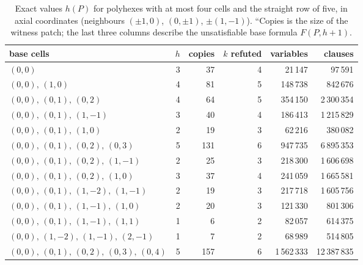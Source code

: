 \begin{table}[ht]
\centering\small
\caption{Exact values $h(P)$ for polyhexes with at most four cells and the straight row of five, in axial coordinates (neighbours $(\pm1,0)$, $(0,\pm1)$, $\pm(1,-1)$). ``Copies is the size of the witness patch; the last three columns describe the unsatisfiable base formula $F(P,h+1)$.}\label{tab:hex}
\begin{tabular}{lrrrrr}\toprule
base cells & $h$ & copies & $k$ refuted & variables & clauses\\\midrule
$(0,0)$ & 3 & 37 & 4 & 21\,147 & 97\,591 \\
$(0,0),\,(1,0)$ & 4 & 81 & 5 & 148\,738 & 842\,676 \\
$(0,0),\,(0,1),\,(0,2)$ & 4 & 64 & 5 & 354\,150 & 2\,300\,354 \\
$(0,0),\,(0,1),\,(1,-1)$ & 3 & 40 & 4 & 186\,413 & 1\,215\,829 \\
$(0,0),\,(0,1),\,(1,0)$ & 2 & 19 & 3 & 62\,216 & 380\,082 \\
$(0,0),\,(0,1),\,(0,2),\,(0,3)$ & 5 & 131 & 6 & 947\,735 & 6\,895\,353 \\
$(0,0),\,(0,1),\,(0,2),\,(1,-1)$ & 2 & 25 & 3 & 218\,300 & 1\,606\,698 \\
$(0,0),\,(0,1),\,(0,2),\,(1,0)$ & 3 & 37 & 4 & 241\,059 & 1\,665\,581 \\
$(0,0),\,(0,1),\,(1,-2),\,(1,-1)$ & 2 & 19 & 3 & 217\,718 & 1\,605\,756 \\
$(0,0),\,(0,1),\,(1,-1),\,(1,0)$ & 2 & 20 & 3 & 121\,330 & 801\,306 \\
$(0,0),\,(0,1),\,(1,-1),\,(1,1)$ & 1 & 6 & 2 & 82\,057 & 614\,375 \\
$(0,0),\,(1,-2),\,(1,-1),\,(2,-1)$ & 1 & 7 & 2 & 68\,989 & 514\,805 \\
$(0,0),\,(0,1),\,(0,2),\,(0,3),\,(0,4)$ & 5 & 157 & 6 & 1\,562\,333 & 12\,387\,835 \\
\bottomrule\end{tabular}
\end{table}

